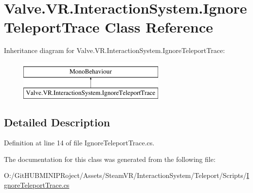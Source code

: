 \hypertarget{class_valve_1_1_v_r_1_1_interaction_system_1_1_ignore_teleport_trace}{}\section{Valve.\+V\+R.\+Interaction\+System.\+Ignore\+Teleport\+Trace Class Reference}
\label{class_valve_1_1_v_r_1_1_interaction_system_1_1_ignore_teleport_trace}
Inheritance diagram for Valve.\+V\+R.\+Interaction\+System.\+Ignore\+Teleport\+Trace\+:\begin{figure}[H]
\begin{center}
\leavevmode
\includegraphics[height=2.000000cm]{class_valve_1_1_v_r_1_1_interaction_system_1_1_ignore_teleport_trace}
\end{center}
\end{figure}


\subsection{Detailed Description}


Definition at line 14 of file Ignore\+Teleport\+Trace.\+cs.



The documentation for this class was generated from the following file\+:\begin{DoxyCompactItemize}
\item 
O\+:/\+Git\+H\+U\+B\+M\+I\+N\+I\+P\+Roject/\+Assets/\+Steam\+V\+R/\+Interaction\+System/\+Teleport/\+Scripts/\mbox{\hyperlink{_ignore_teleport_trace_8cs}{Ignore\+Teleport\+Trace.\+cs}}\end{DoxyCompactItemize}
